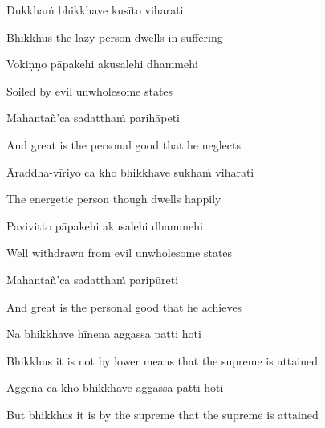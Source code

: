 Dukkhaṁ bhikkhave kusīto viharati

\begin{english}
  Bhikkhus the lazy person dwells in suffering
\end{english}

Vokiṇṇo pāpakehi akusalehi dhammehi

\begin{english}
  Soiled by evil unwholesome states
\end{english}

Mahantañ'ca sadatthaṁ parihāpeti

\begin{english}
  And great is the personal good that he neglects
\end{english}

Āraddha-vīriyo ca kho bhikkhave sukhaṁ viharati

\begin{english}
  The energetic person though dwells happily
\end{english}

Pavivitto pāpakehi akusalehi dhammehi

\begin{english}
  Well withdrawn from evil\ifdigitalversion\makeatletter\hyperlink{endnote88-appendix}\makeatother\fi
  unwholesome states
\end{english}

Mahantañ'ca sadatthaṁ paripūreti

\begin{english}
  And great is the personal good that he achieves
\end{english}

\ifninebythirteenversion\clearpage\fi

Na bhikkhave hīnena aggassa patti hoti

\begin{english}
  Bhikkhus it is not by lower means that the supreme is attained
\end{english}

Aggena ca kho bhikkhave aggassa patti hoti

\begin{english}
  But bhikkhus it is by the supreme that the supreme is attained
\end{english}

\ifbfiveversion\clearpage\fi

